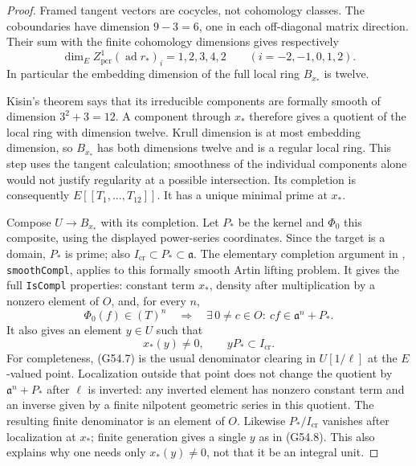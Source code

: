\begin{proof}
Framed tangent vectors are cocycles, not cohomology classes.
The coboundaries have dimension $9-3=6$, one in each
off-diagonal matrix direction.  Their sum with the finite
cohomology dimensions gives respectively
\[
 \dim_E Z^1_{\mathrm{pcr}}(\operatorname{ad}r_*)_i
  =1,2,3,4,2\qquad(i=-2,-1,0,1,2).                           \tag{G54.6}
\]
In particular the embedding dimension of the full local
ring $B_{x_*}$ is twelve.

Kisin's theorem says that its irreducible components are
formally smooth of dimension $3^2+3=12$.  A component through
$x_*$ therefore gives a quotient of the local ring with
dimension twelve.  Krull dimension is at most embedding
dimension, so $B_{x_*}$ has both dimensions twelve and is
a regular local ring.  This step uses the tangent calculation;
smoothness of the individual components alone would not
justify regularity at a possible intersection.
Its completion is consequently $E[[T_1,\ldots,T_{12}]]$.
It has a unique minimal prime at $x_*$.

Compose $U\to B_{x_*}$ with its completion.  Let $P_*$ be
the kernel and $\Phi_0$ this composite, using the displayed
power-series coordinates.  Since the target is a domain,
$P_*$ is prime; also $I_{\mathrm{cr}}\subset P_*\subset
\mathfrak a$.
The elementary completion argument in
,
\texttt{smoothCompl}, applies to this formally smooth
Artin lifting problem.  It gives the full
\texttt{IsCompl} properties: constant term $x_*$,
density after multiplication by a nonzero element of $O$,
and, for every $n$,
\[
 \Phi_0(f)\in(T)^n\quad\Longrightarrow\quad
 \exists\,0\ne c\in O:\ cf\in\mathfrak a^n+P_*.
                                                               \tag{G54.7}
\]
It also gives an element $y\in U$ such that
\[
 x_*(y)\ne0,\qquad yP_*\subset I_{\mathrm{cr}}.              \tag{G54.8}
\]
For completeness, (G54.7) is the usual denominator clearing
in $U[1/\ell]$ at the $E$-valued point.  Localization outside
that point does not change the quotient by
$\mathfrak a^n+P_*$ after $\ell$ is inverted: any inverted
element has nonzero constant term and an inverse given by
a finite nilpotent geometric series in this quotient.
The resulting finite denominator is an element of $O$.
Likewise $P_*/I_{\mathrm{cr}}$ vanishes after localization
at $x_*$; finite generation gives a single $y$ as in
(G54.8).  This also explains why one needs only
$x_*(y)\ne0$, not that it be an integral unit.


\end{proof}
